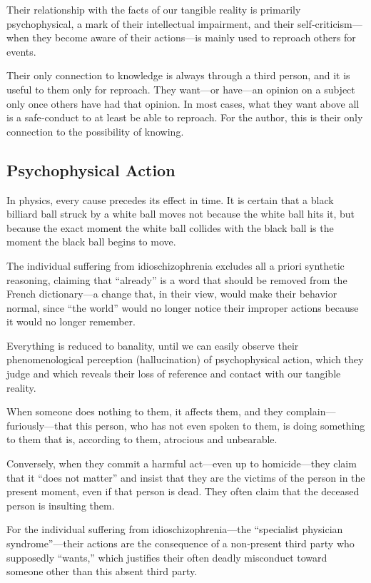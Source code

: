 \documentclass[12pt,oneside]{article}
\begin{document}
Their relationship with the facts of our tangible reality is primarily psychophysical, a mark of their intellectual impairment, and their self‑criticism—when they become aware of their actions—is mainly used to reproach others for events.

Their only connection to knowledge is always through a third person, and it is useful to them only for reproach. They want—or have—an opinion on a subject only once others have had that opinion. In most cases, what they want above all is a safe‑conduct to at least be able to reproach. For the author, this is their only connection to the possibility of knowing.

\subsection{Psychophysical Action}

In physics, every cause precedes its effect in time. It is certain that a black billiard ball struck by a white ball moves not because the white ball hits it, but because the exact moment the white ball collides with the black ball is the moment the black ball begins to move.

The individual suffering from idioschizophrenia excludes all a priori synthetic reasoning, claiming that “already” is a word that should be removed from the French dictionary—a change that, in their view, would make their behavior normal, since “the world” would no longer notice their improper actions because it would no longer remember.

Everything is reduced to banality, until we can easily observe their phenomenological perception (hallucination) of psychophysical action, which they judge and which reveals their loss of reference and contact with our tangible reality.

When someone does nothing to them, it affects them, and they complain—furiously—that this person, who has not even spoken to them, is doing something to them that is, according to them, atrocious and unbearable.

Conversely, when they commit a harmful act—even up to homicide—they claim that it “does not matter” and insist that they are the victims of the person in the present moment, even if that person is dead. They often claim that the deceased person is insulting them.

For the individual suffering from idioschizophrenia—the “specialist physician syndrome”—their actions are the consequence of a non‑present third party who supposedly “wants,” which justifies their often deadly misconduct toward someone other than this absent third party.
\end{document}
